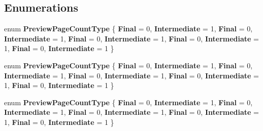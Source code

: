 \subsection*{Enumerations}
\begin{DoxyCompactItemize}
\item 
\mbox{\label{namespace_windows_1_1_u_i_1_1_xaml_1_1_printing_a8e55bb45ae8ef08104a1dea745ce36d3}} 
enum {\bfseries Preview\+Page\+Count\+Type} \{ \newline
{\bfseries Final} = 0, 
{\bfseries Intermediate} = 1, 
{\bfseries Final} = 0, 
{\bfseries Intermediate} = 1, 
\newline
{\bfseries Final} = 0, 
{\bfseries Intermediate} = 1, 
{\bfseries Final} = 0, 
{\bfseries Intermediate} = 1, 
\newline
{\bfseries Final} = 0, 
{\bfseries Intermediate} = 1
 \}
\item 
\mbox{\label{namespace_windows_1_1_u_i_1_1_xaml_1_1_printing_a8e55bb45ae8ef08104a1dea745ce36d3}} 
enum {\bfseries Preview\+Page\+Count\+Type} \{ \newline
{\bfseries Final} = 0, 
{\bfseries Intermediate} = 1, 
{\bfseries Final} = 0, 
{\bfseries Intermediate} = 1, 
\newline
{\bfseries Final} = 0, 
{\bfseries Intermediate} = 1, 
{\bfseries Final} = 0, 
{\bfseries Intermediate} = 1, 
\newline
{\bfseries Final} = 0, 
{\bfseries Intermediate} = 1
 \}
\item 
\mbox{\label{namespace_windows_1_1_u_i_1_1_xaml_1_1_printing_a8e55bb45ae8ef08104a1dea745ce36d3}} 
enum {\bfseries Preview\+Page\+Count\+Type} \{ \newline
{\bfseries Final} = 0, 
{\bfseries Intermediate} = 1, 
{\bfseries Final} = 0, 
{\bfseries Intermediate} = 1, 
\newline
{\bfseries Final} = 0, 
{\bfseries Intermediate} = 1, 
{\bfseries Final} = 0, 
{\bfseries Intermediate} = 1, 
\newline
{\bfseries Final} = 0, 
{\bfseries Intermediate} = 1
 \}
\item 
\mbox{\label{namespace_windows_1_1_u_i_1_1_xaml_1_1_printing_a8e55bb45ae8ef08104a1dea745ce36d3}} 

\end{DoxyCompactItemize}
